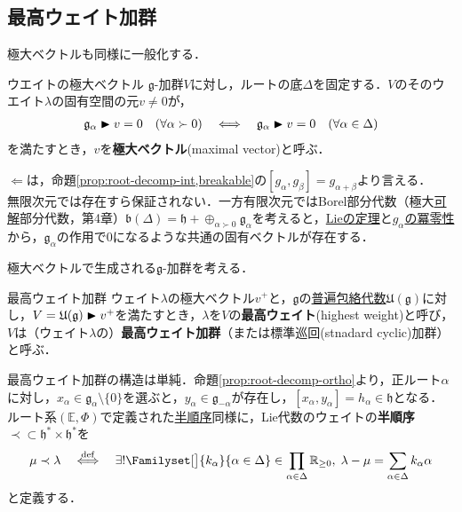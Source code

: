 \documentclass[rep_main]{subfiles}
\begin{document}
\subsection{最高ウェイト加群}
極大ベクトルも同様に一般化する．
\begin{mydef}[label=def:weightspacerep]{ウエイトの極大ベクトル}
	$\mathfrak{g}$-加群$V$に対し，ルートの底$\Delta$を固定する．$V$のそのウエイト$\lambda$の固有空間の元$v \neq 0$が，
	\begin{align}
		\mathfrak{g}_\alpha \blacktriangleright v = 0\quad  (\forall \alpha \succ 0)  \quad \Longleftrightarrow \quad  \mathfrak{g}_\alpha \blacktriangleright v = 0\quad  (\forall \alpha \in \Delta)
	\end{align}
	を満たすとき，$v$を\textbf{極大ベクトル}(maximal vector)と呼ぶ．
\end{mydef}
$\Longleftarrow$は，命題\ref{prop:root-decomp-int,breakable}の$[g_\alpha, g_\beta] = g_{\alpha + \beta}$より言える．\\
無限次元では存在すら保証されない．一方有限次元ではBorel部分代数（極大\hyperref[def:solvable-LieAlg]{可解}部分代数，第4章）$\mathfrak{b}(\Delta) = \mathfrak{h} + \oplus_{\alpha \succ 0} \mathfrak{g}_\alpha$を考えると，\hyperref[thm:Lie]{Lieの定理}と\hyperref[root-decomp-basic1]{$g_\alpha$の冪零性}から，$\mathfrak{g}_\alpha$の作用で$0$になるような共通の固有ベクトルが存在する．

極大ベクトルで生成される$\mathfrak{g}$-加群を考える．
\begin{mydef}[label=def:highest-weight-module]{最高ウェイト加群}
	ウェイト$\lambda$の極大ベクトル$v^+$と，$\mathfrak{g}$の\hyperref[def:univ-env-alg]{普遍包絡代数}$\mathfrak{U}(\mathfrak{g})$に対し，$V = \mathfrak{U}(\mathfrak{g}) \blacktriangleright v^+$を満たすとき，$\lambda$を$V$の\textbf{最高ウェイト}(highest weight)と呼び，$V$は（ウェイト$\lambda$の）\textbf{最高ウェイト加群}（または標準巡回(stnadard cyclic)加群）と呼ぶ．
\end{mydef}
最高ウェイト加群の構造は単純．命題\ref{prop:root-decomp-ortho}より，正ルート$\alpha$に対し，$x_\alpha \in \mathfrak{g}_\alpha\setminus\{0\}$を選ぶと，$y_\alpha \in \mathfrak{g}_{-\alpha}$が存在し，$[x_\alpha, y_\alpha] = h_\alpha \in \mathfrak{h}$となる．\\
ルート系$(\mathbb{E}, \Phi)$で定義された\hyperref[def:base-root,breakable]{半順序}同様に，Lie代数のウェイトの\textbf{半順序}$\prec \subset \mathfrak{h}^* \times \mathfrak{h}^*$を
\begin{equation}
	\mu \prec \lambda  \DEF  \exists! \Familyset[\big]{k_\alpha}{\alpha \in \Delta} \in \prod_{\alpha \in \Delta} \mathbb{R}_{\ge 0},\; \lambda - \mu = \sum_{\alpha \in \Delta} k_\alpha \alpha
\end{equation}
と定義する．
\end{document}
